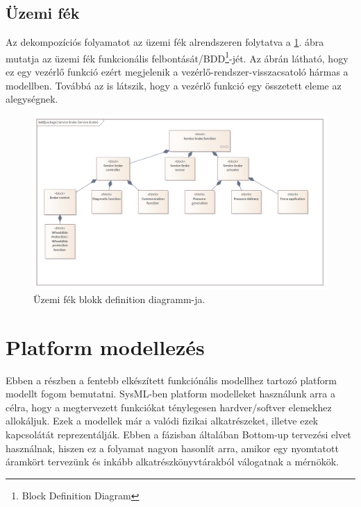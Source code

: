 \subsection{Üzemi fék}
Az dekompozíciós folyamatot az üzemi fék alrendszeren folytatva a \ref{fig:service_brake_bdd}. ábra mutatja az üzemi fék funkcionális felbontását/BDD\footnote{Block Definition Diagram}-jét.
Az ábrán látható, hogy ez egy vezérlő funkció ezért megjelenik a vezérlő-rendszer-visszacsatoló hármas a modellben.
Továbbá az is látszik, hogy a vezérlő funkció egy összetett eleme az alegységnek.

\begin{figure}
    \footnotesize
    \centering
    \includegraphics[width=150mm, keepaspectratio]{figures/Service_Brake_bdd.png}
    \caption{Üzemi fék blokk definition diagramm-ja.}
    \label{fig:service_brake_bdd}
\end{figure}

\section{Platform modellezés}
Ebben a részben a fentebb elkészített funkciónális modellhez tartozó platform modellt fogom bemutatni.
SysML-ben platform modelleket használunk arra a célra, hogy a megtervezett funkciókat ténylegesen hardver/softver elemekhez allokáljuk.
Ezek a modellek már a valódi fizikai alkatrészeket, illetve ezek kapcsolátát reprezentálják.
Ebben a fázisban általában Bottom-up tervezési elvet használnak, hiszen ez a folyamat nagyon hasonlít arra, amikor egy nyomtatott áramkört tervezünk és inkább alkatrészkönyvtárakból válogatnak a mérnökök.

